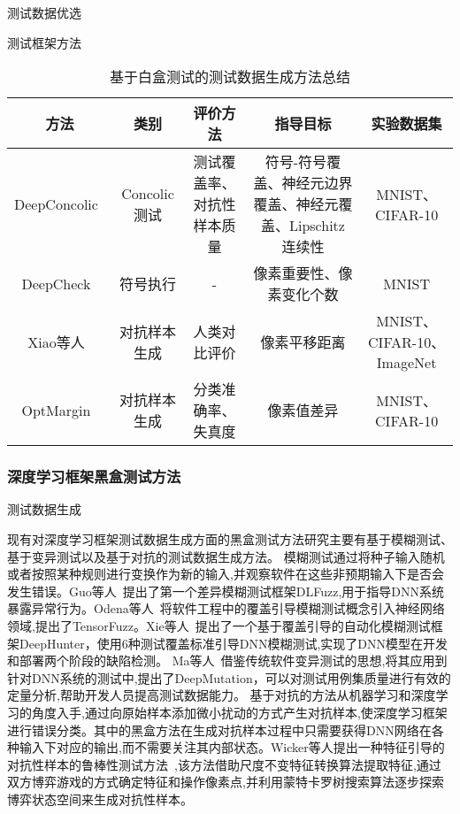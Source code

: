 测试数据优选


测试框架方法



\begin{table}[t]
	\small
	\centering
	\caption{基于白盒测试的测试数据生成方法总结}
	\label{tab:testingData_whiteBox}
	\begin{tabular}{c|c|c|c|c}
		\toprule
		方法 & 类别 & 评价方法 & 指导目标 & 实验数据集 \\
		\midrule
		DeepConcolic~\citess{Sun2018Concolic} & Concolic测试 & 测试覆盖率、对抗性样本质量 & 符号-符号覆盖、神经元边界覆盖、神经元覆盖、Lipschitz 连续性 & MNIST、CIFAR-10 \\
		\midrule
		DeepCheck~\citess{Gopinath2018Symbolic} & 符号执行 & - & 像素重要性、像素变化个数 & MNIST \\
		\midrule
		Xiao等人~\citess{Xiao2018Spatially} & 对抗样本生成 & 人类对比评价 & 像素平移距离 & MNIST、CIFAR-10、ImageNet \\
		\midrule
		OptMargin~\citess{He2018Decision} & 对抗样本生成 & 分类准确率、失真度 & 像素值差异 & MNIST、CIFAR-10 \\
		
	    
		\bottomrule
	\end{tabular}
\end{table}



\subsubsection{深度学习框架黑盒测试方法}

测试数据生成

现有对深度学习框架测试数据生成方面的黑盒测试方法研究主要有基于模糊测试、基于变异测试以及基于对抗的测试数据生成方法。
模糊测试通过将种子输入随机或者按照某种规则进行变换作为新的输入,并观察软件在这些非预期输入下是否会发生错误。Guo等人~提出了第一个差异模糊测试框架DLFuzz,用于指导DNN系统暴露异常行为。Odena等人~将软件工程中的覆盖引导模糊测试概念引入神经网络领域,提出了TensorFuzz。Xie等人~提出了一个基于覆盖引导的自动化模糊测试框架DeepHunter，使用6种测试覆盖标准引导DNN模糊测试,实现了DNN模型在开发和部署两个阶段的缺陷检测。
Ma等人~借鉴传统软件变异测试的思想,将其应用到针对DNN系统的测试中,提出了DeepMutation，可以对测试用例集质量进行有效的定量分析,帮助开发人员提高测试数据能力。
基于对抗的方法从机器学习和深度学习的角度入手,通过向原始样本添加微小扰动的方式产生对抗样本,使深度学习框架进行错误分类。其中的黑盒方法在生成对抗样本过程中只需要获得DNN网络在各种输入下对应的输出,而不需要关注其内部状态。Wicker等人提出一种特征引导的对抗性样本的鲁棒性测试方法~,该方法借助尺度不变特征转换算法提取特征,通过双方博弈游戏的方式确定特征和操作像素点,并利用蒙特卡罗树搜索算法逐步探索博弈状态空间来生成对抗性样本。


